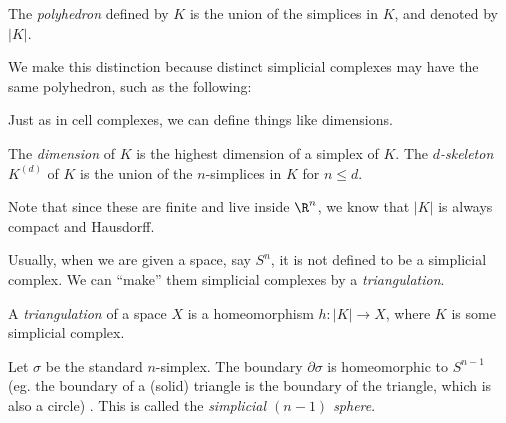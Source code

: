 \documentclass[a4paper]{article}
\begin{document}
\begin{defi}[Polyhedron]
  The \emph{polyhedron} defined by $K$ is the union of the simplices in $K$, and denoted by $|K|$.
\end{defi}
We make this distinction because distinct simplicial complexes may have the same polyhedron, such as the following:
\begin{center}
\end{center}
Just as in cell complexes, we can define things like dimensions.
\begin{defi}
  The \emph{dimension} of $K$ is the highest dimension of a simplex of $K$. The \emph{$d$-skeleton} $K^{(d)}$ of $K$ is the union of the $n$-simplices in $K$ for $n \leq d$.
\end{defi}
Note that since these are finite and live inside $\R^n$, we know that $|K|$ is always compact and Hausdorff.

Usually, when we are given a space, say $S^n$, it is not defined to be a simplicial complex. We can ``make'' them simplicial complexes by a \emph{triangulation}.
\begin{defi}[Triangulation]
  A \emph{triangulation} of a space $X$ is a homeomorphism $h: |K| \to X$, where $K$ is some simplicial complex.
\end{defi}

\begin{eg}
  Let $\sigma$ be the standard $n$-simplex. The boundary $\partial \sigma$ is homeomorphic to $S^{n - 1}$ (eg. the boundary of a (solid) triangle is the boundary of the triangle, which is also a circle) . This is called the \emph{simplicial $(n - 1)$ sphere}.
\end{eg}
\end{document}
